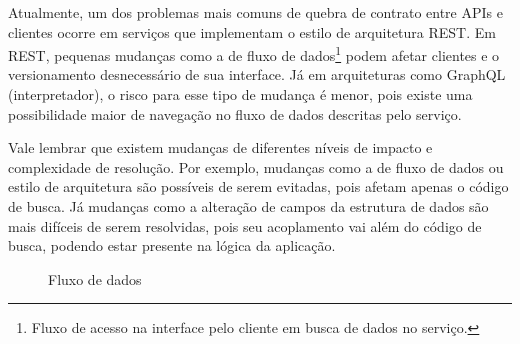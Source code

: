 Atualmente, um dos problemas mais comuns de quebra de contrato entre APIs e clientes ocorre em serviços que implementam o estilo de arquitetura REST. Em REST, pequenas mudanças como a de fluxo de dados\footnote{
  Fluxo de acesso na interface pelo cliente em busca de dados no serviço.
} podem afetar clientes e o versionamento desnecessário de sua interface. Já em arquiteturas como GraphQL (interpretador), o risco para esse tipo de mudança é menor, pois existe uma possibilidade maior de navegação no fluxo de dados descritas pelo serviço.


Vale lembrar que existem mudanças de diferentes níveis de impacto e complexidade de resolução. Por exemplo, mudanças como a de fluxo de dados ou estilo de arquitetura são possíveis de serem evitadas, pois afetam apenas o código de busca. Já mudanças como a alteração de campos da estrutura de dados são mais difíceis de serem resolvidas, pois seu acoplamento vai além do código de busca, podendo estar presente na lógica da aplicação.

\begin{figure}[H]
  \centering
  \caption{Fluxo de dados}
\end{figure}


